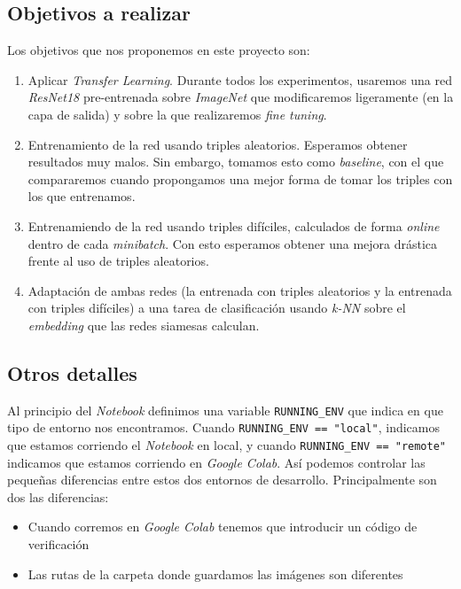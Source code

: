 \documentclass[11pt]{article}
\begin{document}
\subsection{Objetivos a realizar}

Los objetivos que nos proponemos en este proyecto son:

\begin{enumerate}
  \item Aplicar \emph{Transfer Learning}. Durante todos los experimentos, usaremos una red \emph{ResNet18} pre-entrenada sobre \emph{ImageNet} que modificaremos ligeramente (en la capa de salida) y sobre la que realizaremos \emph{fine tuning}.
  \item Entrenamiento de la red usando triples aleatorios. Esperamos obtener resultados muy malos. Sin embargo, tomamos esto como \emph{baseline}, con el que compararemos cuando propongamos una mejor forma de tomar los triples con los que entrenamos.
  \item Entrenamiendo de la red usando triples difíciles, calculados de forma \emph{online} dentro de cada \emph{minibatch}. Con esto esperamos obtener una mejora drástica frente al uso de triples aleatorios.
  \item Adaptación de ambas redes (la entrenada con triples aleatorios y la entrenada con triples difíciles) a una tarea de clasificación usando \emph{k-NN} sobre el \emph{embedding} que las redes siamesas calculan.
\end{enumerate}

\subsection{Otros detalles}

Al principio del \emph{Notebook} definimos una variable \lstinline{RUNNING_ENV} que indica en que tipo de entorno nos encontramos. Cuando \lstinline{RUNNING_ENV == "local"}, indicamos que estamos corriendo el \emph{Notebook} en local, y cuando \lstinline{RUNNING_ENV == "remote"} indicamos que estamos corriendo en \emph{Google Colab}. Así podemos controlar las pequeñas diferencias entre estos dos entornos de desarrollo. Principalmente son dos las diferencias:

\begin{itemize}
    \item Cuando corremos en \emph{Google Colab} tenemos que introducir un código de verificación
    \item Las rutas de la carpeta donde guardamos las imágenes son diferentes
\end{itemize}
\end{document}
